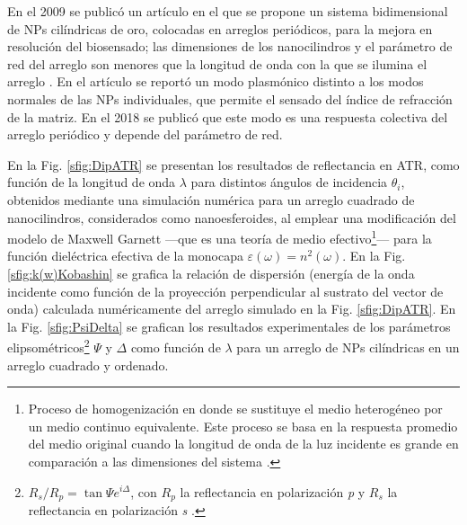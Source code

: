 		
En el 2009 se public\'o un art\'iculo \cite{kabashin2009plasmonic} en el que se propone un sistema bidimensional de NPs cilíndricas de oro, colocadas en arreglos periódicos, para la mejora en resoluci\'on  del biosensado; las dimensiones de los nanocilindros y el parámetro de red del arreglo son menores que la longitud de onda con la que se ilumina el arreglo \cite{kabashin2009plasmonic}.  En el artículo se reportó un modo plasmónico distinto a los modos normales de las NPs individuales, que permite el sensado del índice de refracción de la matriz.  En el 2018 se publicó que este modo es una respuesta colectiva del arreglo periódico \cite{danilov2018ultra} y depende del parámetro de red.  

 En la Fig.  \ref{sfig:DipATR} se presentan los resultados de reflectancia en ATR, como función de la longitud de onda $\lambda$ para distintos ángulos de incidencia $\theta_i$, obtenidos mediante una simulación numérica para un arreglo cuadrado de nanocilindros, considerados como nanoesferoides, al emplear una modificación del modelo de Maxwell Garnett \cite{atkinson2006anisotropic} ---que es una teoría de medio efectivo\footnote{Proceso de homogenización en donde se sustituye el medio heterogéneo por un medio continuo equivalente.  Este proceso se basa en la respuesta promedio del medio original cuando la longitud de onda de la luz incidente es grande en comparación a las dimensiones del sistema \cite{sihvola1999mixing}. }--- para la función dieléctrica efectiva de la monocapa $\varepsilon(\omega) = n^2 (\omega)$.   En la Fig.  \ref{sfig:k(w)Kobashin} se grafica la relación de dispersión  (energía de la onda incidente como función de la  proyección perpendicular al sustrato del vector de onda) calculada numéricamente del arreglo simulado en la Fig.  \ref{sfig:DipATR}.  En la Fig.  \ref{sfig:PsiDelta} se grafican los resultados experimentales de los parámetros elipsométricos\footnote{$R_s/R_p = \tan\Psi e^{i\Delta}$, con $R_p$ la reflectancia en polarización \emph{p} y $R_s$ la reflectancia en polarización \emph{s} \cite{danilov2018ultra}. } $\Psi$ y $\Delta$ como función de $\lambda$ para un arreglo de NPs cilíndricas en un arreglo cuadrado y ordenado. 

